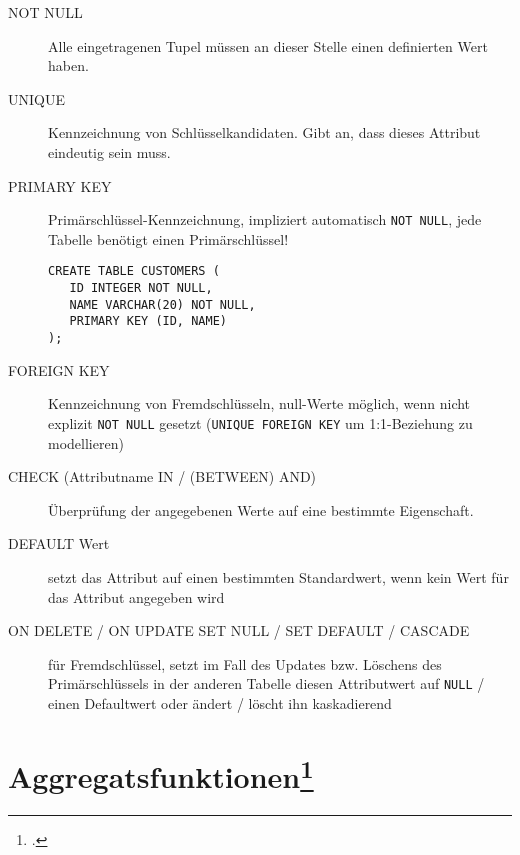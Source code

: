 \documentclass{lehramt-informatik-haupt}
\begin{document}
\begin{description}

\item[NOT NULL]

Alle eingetragenen Tupel müssen an dieser Stelle einen definierten Wert
haben.

\item[UNIQUE]

Kennzeichnung von Schlüsselkandidaten. Gibt an, dass dieses Attribut
eindeutig sein muss.

\item[PRIMARY KEY]

Primärschlüssel-Kennzeichnung, impliziert automatisch \verb|NOT NULL|,
jede Tabelle benötigt einen Primärschlüssel!

\begin{verbatim}
CREATE TABLE CUSTOMERS (
   ID INTEGER NOT NULL,
   NAME VARCHAR(20) NOT NULL,
   PRIMARY KEY (ID, NAME)
);
\end{verbatim}

\item[FOREIGN KEY]

Kennzeichnung von Fremdschlüsseln, null-Werte möglich, wenn nicht
explizit \verb|NOT NULL| gesetzt (\verb|UNIQUE FOREIGN KEY| um
1:1-Beziehung zu modellieren)

\item[CHECK (Attributname IN / (BETWEEN) AND)]

Überprüfung der angegebenen Werte auf eine bestimmte Eigenschaft.

\item[DEFAULT Wert]

setzt das Attribut auf einen bestimmten Standardwert, wenn kein Wert für
das Attribut angegeben wird

\item[ON DELETE / ON UPDATE SET NULL / SET DEFAULT / CASCADE]

für Fremdschlüssel, setzt im Fall des Updates bzw. Löschens des
Primärschlüssels in der anderen Tabelle diesen Attributwert auf
\verb|NULL| / einen Defaultwert oder ändert / löscht ihn kaskadierend
\end{description}

%

\section{Aggregatsfunktionen\footcite[Seite 10]{db:fs:2}}
\end{document}
